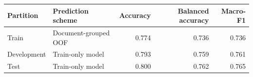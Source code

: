 \begin{tabular}{llrrr}
\toprule
Partition & Prediction scheme & Accuracy & Balanced accuracy & Macro-F1 \\
\midrule
Train & Document-grouped OOF & 0.774 & 0.736 & 0.736 \\
Development & Train-only model & 0.793 & 0.759 & 0.761 \\
Test & Train-only model & 0.800 & 0.762 & 0.765 \\
\bottomrule
\end{tabular}
